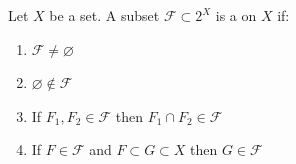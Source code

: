 Let $X$ be a set. A subset $\mathcal{F} \subset 2^X$ is a  on $X$ if:
\begin{enumerate}
\item $\mathcal{F} \neq \varnothing$
\item $\varnothing \notin \mathcal{F}$
\item If $F_1, F_2 \in \mathcal{F}$ then $F_1 \cap F_2 \in \mathcal{F}$
\item If $F \in \mathcal{F}$ and $F \subset G \subset X$ then $G \in \mathcal{F}$
\end{enumerate}

